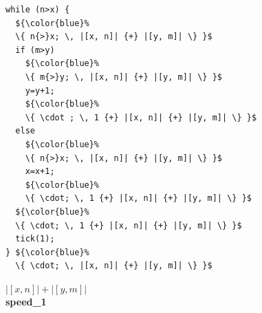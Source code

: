 \documentclass[nocopyrightspace,preprint,pldi]{sigplanconf-pldi15}
\begin{document}
\begin{figure}
 \setlength{\progwidth}{.22\linewidth}
  \centering
\vspace{-.3cm}
\hspace{-0.4cm}
  \begin{minipage}[b]{.18\linewidth}
    \begin{center}
   \begin{lstlisting}[]
while (n>x) {
  ${\color{blue}%
  \{ n{>}x; \, |[x, n]| {+} |[y, m]| \} }$
  if (m>y)
    ${\color{blue}%
    \{ m{>}y; \, |[x, n]| {+} |[y, m]| \} }$
    y=y+1;
    ${\color{blue}%
    \{ \cdot ; \, 1 {+} |[x, n]| {+} |[y, m]| \} }$
  else
    ${\color{blue}%
    \{ n{>}x; \, |[x, n]| {+} |[y, m]| \} }$
    x=x+1;
    ${\color{blue}%
    \{ \cdot; \, 1 {+} |[x, n]| {+} |[y, m]| \} }$
  ${\color{blue}%
  \{ \cdot; \, 1 {+} |[x, n]| {+} |[y, m]| \} }$
  tick(1);
} ${\color{blue}%
  \{ \cdot; \, |[x, n]| {+} |[y, m]| \} }$
   \end{lstlisting}
\vspace{-2.5ex}
$|[x, n]| + |[y, m]|$
\\[.4\baselineskip]
      {\bf speed\_1}
    \end{center}
  \end{minipage}
%
\hfill
%
  \begin{minipage}[b]{\progwidth}
    \begin{center}
   \begin{lstlisting}


\end{lstlisting}
\end{center}
\end{minipage}
\end{figure}
\end{document}
